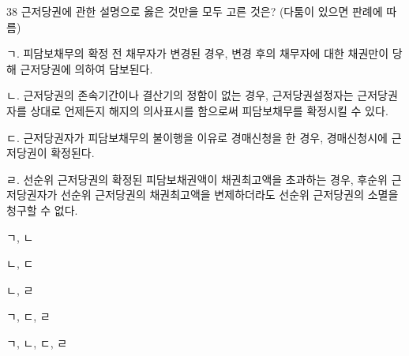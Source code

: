 \begin{question}{38}
근저당권에 관한 설명으로 옳은 것만을 모두 고른 것은? (다툼이 있으면 판례에 따름)
\begin{framedtext}
ㄱ. 피담보채무의 확정 전 채무자가 변경된 경우, 변경 후의 채무자에 대한 채권만이 당해 근저당권에 의하여 담보된다. \par
ㄴ. 근저당권의 존속기간이나 결산기의 정함이 없는 경우, 근저당권설정자는 근저당권자를 상대로 언제든지 해지의 의사표시를 함으로써 피담보채무를 확정시킬 수 있다. \par
ㄷ. 근저당권자가 피담보채무의 불이행을 이유로 경매신청을 한 경우, 경매신청시에 근저당권이 확정된다. \par
ㄹ. 선순위 근저당권의 확정된 피담보채권액이 채권최고액을 초과하는 경우, 후순위 근저당권자가 선순위 근저당권의 채권최고액을 변제하더라도 선순위 근저당권의 소멸을 청구할 수 없다.
\end{framedtext}
\begin{choices}
  \item ㄱ, ㄴ
  \item ㄴ, ㄷ
  \item ㄴ, ㄹ
  \item ㄱ, ㄷ, ㄹ
  \item ㄱ, ㄴ, ㄷ, ㄹ
\end{choices}
\end{question}
